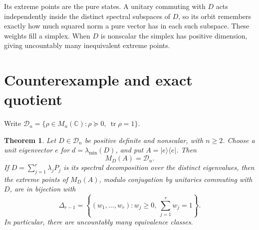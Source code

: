 \documentclass[11pt]{article}
\newcommand{\C}{\mathbb C}
\newcommand{\Dens}{\mathcal D}
\newcommand{\tr}{\operatorname{tr}}
\newtheorem{theorem}{Theorem}
\begin{document}
Its extreme points are the pure states.  A unitary commuting with \(D\)
acts independently inside the distinct spectral subspaces of \(D\), so its
orbit remembers exactly how much squared norm a pure vector has in each such
subspace.  These weights fill a simplex.  When \(D\) is nonscalar the simplex
has positive dimension, giving uncountably many inequivalent extreme points.

\section{Counterexample and exact quotient}

Write \(\Dens_n=\{\rho\in M_n(\C):\rho\succeq0,\ \tr\rho=1\}\).

\begin{theorem}\label{thm:main}
Let \(D\in\Dens_n\) be positive definite and nonscalar, with \(n\ge2\).
Choose a unit eigenvector \(e\) for \(d=\lambda_{\min}(D)\), and put
\(A=|e\rangle\langle e|\).  Then
\[
 M_D(A)=\Dens_n.
\]
If \(D=\sum_{j=1}^r\lambda_jP_j\) is its spectral decomposition over the
distinct eigenvalues, then the extreme points of \(M_D(A)\), modulo
conjugation by unitaries commuting with \(D\), are in bijection with
\[
 \Delta_{r-1}=\left\{(w_1,\ldots,w_r):w_j\ge0,
 \ \sum_{j=1}^r w_j=1\right\}.
\]
In particular, there are uncountably many equivalence classes.
\end{theorem}
\end{document}
